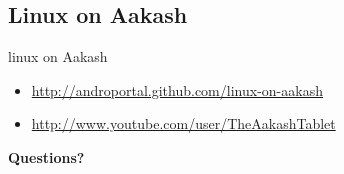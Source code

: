 \documentclass{beamer}
\begin{document}
\subsection{Linux on Aakash}
\begin{frame}{linux on Aakash}
  \begin{block}{}
    \begin{itemize}
    \item \url{http://androportal.github.com/linux-on-aakash}
    \item \url{http://www.youtube.com/user/TheAakashTablet}
    \end{itemize}
  \end{block}
\end{frame}



\begin{frame}{}
  \centerline{\bf Questions?}
\end{frame}
\end{document}
